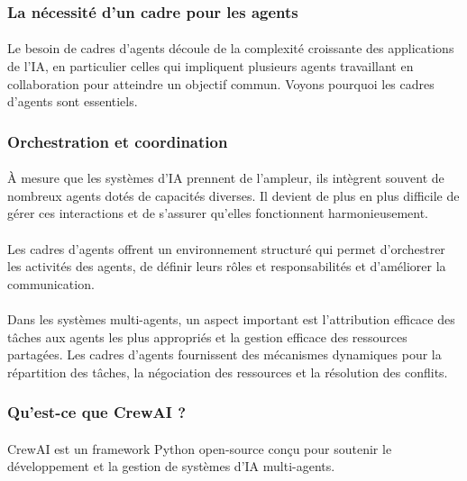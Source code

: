\subsubsection{La nécessité d'un cadre pour les agents }

\paragraph{}
Le besoin de cadres d'agents découle de la complexité croissante des applications de l'IA, en particulier celles qui impliquent plusieurs agents travaillant en collaboration pour atteindre un objectif commun. Voyons pourquoi les cadres d'agents sont essentiels.   

\subsubsection{Orchestration et coordination }

\paragraph{}
À mesure que les systèmes d'IA prennent de l'ampleur, ils intègrent souvent de nombreux agents dotés de capacités diverses. Il devient de plus en plus difficile de gérer ces interactions et de s'assurer qu'elles fonctionnent harmonieusement.

\paragraph{}
Les cadres d'agents offrent un environnement structuré qui permet d'orchestrer les activités des agents, de définir leurs rôles et responsabilités et d'améliorer la communication.
\paragraph{}
Dans les systèmes multi-agents, un aspect important est l'attribution efficace des tâches aux agents les plus appropriés et la gestion efficace des ressources partagées. Les cadres d'agents fournissent des mécanismes dynamiques pour la répartition des tâches, la négociation des ressources et la résolution des conflits.

\subsubsection{Qu'est-ce que CrewAI ? }
\paragraph{}
CrewAI est un framework Python open-source conçu pour soutenir le développement et la gestion de systèmes d'IA multi-agents.
